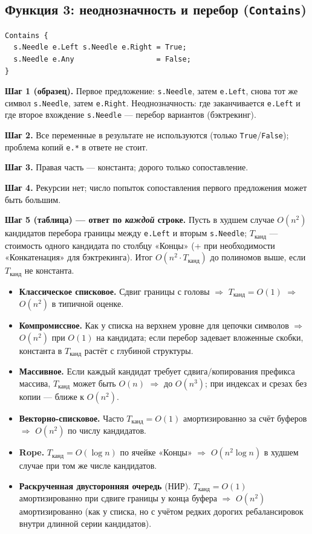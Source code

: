 \documentclass[12pt,a4paper]{article}
\newcommand{\bigO}{\ensuremath{O}}
\begin{document}
\subsection{Функция 3: неоднозначность и перебор (\texttt{Contains})}

\begin{lstlisting}
Contains {
  s.Needle e.Left s.Needle e.Right = True;
  s.Needle e.Any                   = False;
}
\end{lstlisting}

\textbf{Шаг 1 (образец).} Первое предложение: \texttt{s.Needle}, затем \texttt{e.Left}, снова тот же символ \texttt{s.Needle}, затем \texttt{e.Right}. Неоднозначность: где заканчивается \texttt{e.Left} и где второе вхождение \texttt{s.Needle} --- перебор вариантов (бэктрекинг).

\textbf{Шаг 2.} Все переменные в результате не используются (только \texttt{True}/\texttt{False}); проблема копий \texttt{e.*} в ответе не стоит.

\textbf{Шаг 3.} Правая часть --- константа; дорого только сопоставление.

\textbf{Шаг 4.} Рекурсии нет; число попыток сопоставления первого предложения может быть большим.

\textbf{Шаг 5 (таблица) --- ответ по \emph{каждой} строке.} Пусть в худшем случае \(\bigO(n^2)\) кандидатов перебора границы между \texttt{e.Left} и вторым \texttt{s.Needle}; \(T_{\text{канд}}\) --- стоимость одного кандидата по столбцу «Концы» (+ при необходимости «Конкатенация» для бэктрекинга). Итог \(\bigO(n^2\cdot T_{\text{канд}})\) до полиномов выше, если \(T_{\text{канд}}\) не константа.

\begin{itemize}
  \item \textbf{Классическое списковое.} Сдвиг границы с головы \(\Rightarrow\) \(T_{\text{канд}}=O(1)\) \(\Rightarrow\) \(\bigO(n^2)\) в типичной оценке.
  \item \textbf{Компромиссное.} Как у списка на верхнем уровне для цепочки символов \(\Rightarrow\) \(\bigO(n^2)\) при \(O(1)\) на кандидата; если перебор задевает вложенные скобки, константа в \(T_{\text{канд}}\) растёт с глубиной структуры.
  \item \textbf{Массивное.} Если каждый кандидат требует сдвига/копирования префикса массива, \(T_{\text{канд}}\) может быть \(O(n)\) \(\Rightarrow\) до \(\bigO(n^3)\); при индексах и срезах без копии --- ближе к \(\bigO(n^2)\).
  \item \textbf{Векторно-списковое.} Часто \(T_{\text{канд}}=O(1)\) амортизированно за счёт буферов \(\Rightarrow\) \(\bigO(n^2)\) по числу кандидатов.
  \item \textbf{Rope.} \(T_{\text{канд}}=O(\log n)\) по ячейке «Концы» \(\Rightarrow\) \(\bigO(n^2\log n)\) в худшем случае при том же числе кандидатов.
  \item \textbf{Раскрученная двусторонняя очередь} (НИР). \(T_{\text{канд}}=O(1)\) амортизированно при сдвиге границы у конца буфера \(\Rightarrow\) \(\bigO(n^2)\) амортизированно (как у списка, но с учётом редких дорогих ребалансировок внутри длинной серии кандидатов).
\end{itemize}
\end{document}

